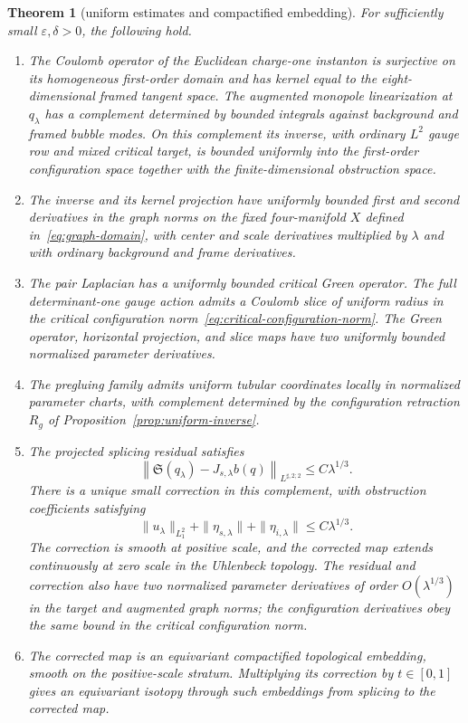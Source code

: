 \documentclass[11pt]{amsart}
\theoremstyle{definition}
\theoremstyle{remark}
\theoremstyle{plain}
\newtheorem{thmletter}{Theorem}
\begin{document}
\begin{thmletter}[uniform estimates and compactified embedding]
\label{thm:intro-analytic}
For sufficiently small $\varepsilon,\delta>0$, the following hold.
\begin{enumerate}
\item The Coulomb operator of the Euclidean charge-one instanton is
surjective on its homogeneous first-order domain and has kernel
equal to the eight-dimensional framed tangent space.
The augmented monopole linearization at $q_\lambda$ has a complement
determined by bounded integrals against background and framed bubble
modes.  On this complement its inverse, with ordinary $L^2$ gauge row
and mixed critical target, is bounded uniformly into the first-order
configuration space together with the finite-dimensional obstruction
space.

\item The inverse and its kernel projection have uniformly bounded first and
second derivatives in the graph norms on the fixed four-manifold $X$
defined in~\eqref{eq:graph-domain}, with center and scale
derivatives multiplied by $\lambda$ and with ordinary background and
frame derivatives.

\item The pair Laplacian has a uniformly bounded critical Green operator.
The full determinant-one gauge action admits a Coulomb slice of uniform
radius in the critical configuration norm~\eqref{eq:critical-configuration-norm}.
The Green operator, horizontal projection, and slice maps have two
uniformly bounded normalized parameter derivatives.
\item The pregluing family
admits uniform tubular coordinates locally in normalized parameter
charts, with complement determined by the configuration retraction $R_g$
of Proposition~\ref{prop:uniform-inverse}.

\item The projected splicing residual satisfies
\begin{equation}\label{eq:intro-residual}
 \left\|\mathfrak S(q_\lambda)-J_{s,\lambda}b(q)\right\|_{L^{\sharp,2;2}}
 \leq C\lambda^{1/3}.
\end{equation}
There is a unique small correction in this complement, with
obstruction coefficients satisfying
\begin{equation}\label{eq:intro-correction}
 \|u_\lambda\|_{L^2_1}
 +\|\eta_{s,\lambda}\|+\|\eta_{i,\lambda}\|
 \leq C\lambda^{1/3}.
\end{equation}
The correction is smooth at positive scale, and the corrected map
extends continuously at zero scale in the Uhlenbeck topology.
The residual and correction also have two normalized parameter
derivatives of order $O(\lambda^{1/3})$ in the target and augmented
graph norms; the configuration derivatives obey the same bound in
the critical configuration norm.
\item The corrected map is an equivariant compactified topological
embedding, smooth on the positive-scale stratum.  Multiplying its
correction by $t\in[0,1]$ gives an equivariant isotopy through such
embeddings from splicing to the corrected map.
\end{enumerate}
\end{thmletter}
\end{document}
